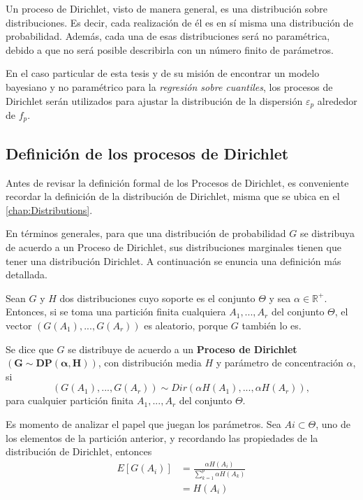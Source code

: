 Un proceso de Dirichlet, visto de manera general, es una distribuci\'on sobre distribuciones. Es decir, cada realizaci\'on de él es en sí misma una distribuci\'on de probabilidad. Adem\'as, cada una de esas distribuciones ser\'a no param\'etrica, debido a que no ser\'a posible describirla con un n\'umero finito de par\'ametros.

En el caso particular de esta tesis y de su misi\'on de encontrar un modelo bayesiano y no param\'etrico para la \textit{regresi\'on sobre cuantiles}, los procesos de Dirichlet ser\'an utilizados para ajustar la distribuci\'on de la dispersi\'on $\varepsilon_p$ alrededor de $f_p$.

\subsection{Definici\'on de los procesos de Dirichlet}

Antes de revisar la definici\'on formal de los Procesos de Dirichlet, es conveniente recordar la definici\'on de la distribuci\'on de Dirichlet, misma que se ubica en el \autoref{chap:Distributions}.

En t\'erminos generales, para que una distribuci\'on de probabilidad $G$ se distribuya de acuerdo a un Proceso de Dirichlet, sus distribuciones marginales tienen que tener una distribuci\'on Dirichlet. A continuaci\'on se enuncia una definici\'on m\'as detallada.

\begin{defin}
    Sean $G$ y $H$ dos distribuciones cuyo soporte es el conjunto $\Theta$ y sea $\alpha \in \mathbb{R}^+$. Entonces, si se toma una partici\'on finita cualquiera $A_1,...,A_r$ del conjunto $\Theta$, el vector $(G(A_1),...,G(A_r))$ es aleatorio, porque $G$ tambi\'en lo es.
    
    Se dice que $G$ se distribuye de acuerdo a un \textbf{Proceso de Dirichlet} $\bm{(G \sim DP(\alpha,H))}$, con distribuci\'on media $H$ y par\'ametro de concentraci\'on $\alpha$, si
    \begin{equation*}
        (G(A_1),...,G(A_r)) \sim Dir(\alpha H(A_1),...,\alpha H(A_r)), 
    \end{equation*}
    para cualquier partici\'on finita $A_1,...,A_r$ del conjunto $\Theta$.
\end{defin}

Es momento de analizar el papel que juegan los par\'ametros. Sea $Ai \subset \Theta$, uno de los elementos de la partici\'on anterior, y recordando las propiedades de la distribuci\'on de Dirichlet, entonces
\begin{equation*}
\begin{aligned}
    E[G(A_i)] 
    &= \frac{\alpha H(A_i)}{\sum_{k=1}^p \alpha H(A_k)} \\
    &= H(A_i) \\
\end{aligned}
\end{equation*}

